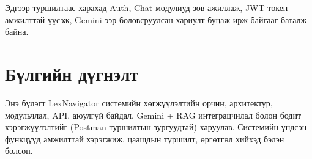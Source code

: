 Эдгээр туршилтаас харахад Auth, Chat модулиуд зөв ажиллаж, JWT токен амжилттай үүсэж, Gemini-ээр боловсруулсан хариулт буцаж ирж байгааг баталж байна.

\section{Бүлгийн дүгнэлт}

Энэ бүлэгт LexNavigator системийн хөгжүүлэлтийн орчин, архитектур, модульчлал, API, аюулгүй байдал, Gemini + RAG интеграцчилал болон бодит хэрэгжүүлэлтийг (Postman туршилтын зургуудтай) харуулав. Системийн үндсэн функцүүд амжилттай хэрэгжиж, цаашдын туршилт, өргөтгөл хийхэд бэлэн болсон.
